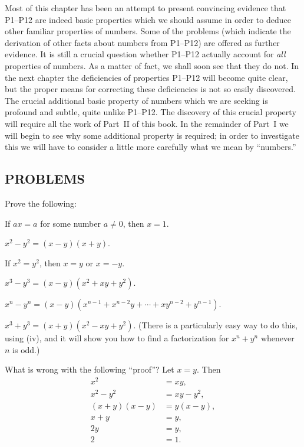 Most of this chapter has been an attempt to present convincing evidence that
P1--P12 are indeed basic properties which we should assume in order to deduce
other familiar properties of numbers. Some of the problems (which indicate
the derivation of other facts about numbers from P1--P12) are offered as
further evidence. It is still a crucial question whether P1--P12 actually
account for \emph{all} properties of numbers. As a matter of fact, we shall
soon see that they do not. In the next chapter the deficiencies of properties
P1--P12 will become quite clear, but the proper means for correcting these
deficiencies is not so easily discovered. The crucial additional basic
property of numbers which we are seeking is profound and subtle, quite unlike
P1--P12. The discovery of this crucial property will require all the work of
Part~II of this book. In the remainder of Part~I we will begin to see why
some additional property is required; in order to investigate this we will
have to consider a little more carefully what we mean by ``numbers.''

\subsection*{PROBLEMS}

 Prove the following:
\begin{romans}
\item If $ax = a$ for some number $a \neq 0$, then $x = 1$.
\item $x^2 - y^2 = (x-y)(x+y)$.
\item If $x^2 = y^2$, then $x = y$ or $x = -y$.
\item $x^3 - y^3 = (x-y)(x^2+xy+y^2)$.
\item $x^n - y^n = (x-y)(x^{n-1} + x^{n-2}y + \cdots + xy^{n-2} + y^{n-1})$.
\item $x^3 + y^3 = (x+y)(x^2 - xy + y^2)$. (There is a particularly easy way
  to do this, using (iv), and it will show you how to find a factorization
  for $x^n + y^n$ whenever $n$ is odd.)
\end{romans}

 What is wrong with the following ``proof''? Let $x=y$. Then
\begin{align*}
x^2 &= xy,\\
x^2 - y^2 &= xy - y^2,\\
(x+y)(x-y) &= y(x-y),\\
x+y &= y,\\
2y &= y,\\
2 &= 1.
\end{align*}

